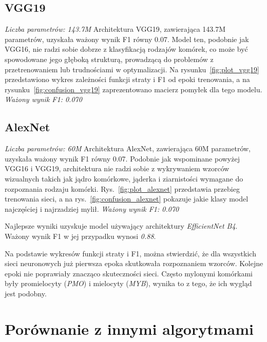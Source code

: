 \subsection{VGG19}
\textit{Liczba parametrów: 143.7M}
Architektura VGG19, zawierająca 143.7M parametrów, uzyskała ważony wynik F1 równy 0.07. Model ten, podobnie jak VGG16, nie radzi sobie dobrze z klasyfikacją rodzajów komórek, co może być spowodowane jego głęboką strukturą, prowadzącą do problemów z przetrenowaniem lub trudnościami w optymalizacji. Na rysunku~\ref{fig:plot_vgg19} przedstawiono wykres zależności funkcji straty i F1 od epoki trenowania, a na rysunku~\ref{fig:confusion_vgg19} zaprezentowano macierz pomyłek dla tego modelu.
\textit{Ważony wynik F1: 0.070}

\subsection{AlexNet}
\textit{Liczba parametrów: 60M}
Architektura AlexNet, zawierająca 60M parametrów, uzyskała ważony wynik F1 równy 0.07. Podobnie jak wspominane powyżej VGG16 i VGG19, architektura nie radzi sobie z wykrywaniem wzorców wizualnych takich jak jądro komórkowe, jąderka i ziarnistości wymagane do rozpoznania rodzaju komórki. Rys.~\ref{fig:plot_alexnet} przedstawia przebieg trenowania sieci, a na rys.~\ref{fig:confusion_alexnet} pokazuje jakie klasy model najczęściej i najrzadziej mylił.
\textit{Ważony wynik F1: 0.070}

\newline
\newline
\newline

Najlepsze wyniki uzyskuje model używający architektury \textit{EfficientNet B4}.
Ważony wynik F1 w jej przypadku wynosi \textit{0.88}.

Na podstawie wykresów funkcji straty i F1, można stwierdzić, że dla wszystkich sieci neuronowych już pierwsza epoka skutkowała rozpoznaniem wzorców.
Kolejne epoki nie poprawiały znacząco skuteczności sieci.
Często mylonymi komórkami były promielocyty (\textit{PMO}) i mielocyty (\textit{MYB}), wynika to z tego, że ich wygląd jest podobny.


\section{Porównanie z innymi algorytmami}

